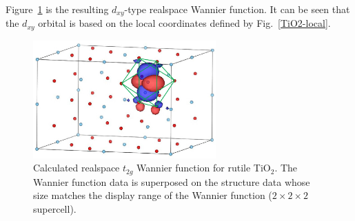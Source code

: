 \documentclass{article}
\begin{document}
Figure~\ref{vesta-TiO2} is the resulting $d_{xy}$-type realspace Wannier function. It can be seen that the $d_{xy}$ orbital is based on the local coordinates defined by Fig.~\ref{TiO2-local}.
\begin{figure}[H] 
\centering
\includegraphics[width=7cm]{dat.wan-realspace-TiO2.eps}
\caption{Calculated realspace $t_{2g}$ Wannier function for rutile TiO$_2$. The Wannier function data is superposed on the structure data whose size matches the display range of the Wannier function ($2\times2\times2$ supercell).}
\label{vesta-TiO2}
\end{figure}

\clearpage 
\end{document}
